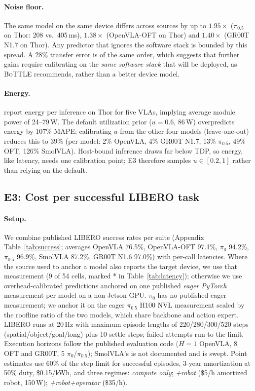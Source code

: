\documentclass[10pt]{article}
\newcommand{\bottle}{\textsc{BoTTLE}}
\begin{document}
\paragraph{Noise floor.} The same model on the same device differs across sources by up to
$1.95\times$ ($\pi_{0.5}$ on Thor: 208 vs.\ 405\,ms), $1.38\times$ (OpenVLA-OFT on Thor) and
$1.40\times$ (GR00T N1.7 on Thor). Any predictor that ignores the software stack is bounded by
this spread. A 28\% transfer error is of the same order, which suggests that further gains
require calibrating on the \emph{same software stack} that will be deployed, as \bottle{}
recommends, rather than a better device model.

\paragraph{Energy.} \citet{waseem2026where} report energy per inference on Thor for five VLAs,
implying average module power of 24--79\,W. The default utilization prior ($u{=}0.6$, 86\,W)
overpredicts energy by 107\% MAPE; calibrating $u$ from the other four models (leave-one-out)
reduces this to 39\% (per model: 2\% OpenVLA, 4\% GR00T N1.7, 13\% $\pi_{0.5}$, 49\% OFT, 126\%
SmolVLA). Host-bound inference draws far below TDP, so energy, like latency, needs one calibration
point; E3 therefore samples $u\in[0.2,1]$ rather than relying on the default.

\subsection{E3: Cost per successful LIBERO task}\label{sec:e3}
\paragraph{Setup.} We combine published LIBERO success rates per suite (Appendix
Table~\ref{tab:success}; averages OpenVLA 76.5\%, OpenVLA-OFT 97.1\%, $\pi_0$ 94.2\%, $\pi_{0.5}$
96.9\%, SmolVLA 87.2\%, GR00T N1.6 97.0\%) with per-call latencies. Where the source used to anchor a
model also reports the target device, we use that measurement (9 of 54 cells, marked * in
Table~\ref{tab:latency}); otherwise we use overhead-calibrated predictions anchored on one
published \emph{eager PyTorch} measurement per model on a non-Jetson GPU. $\pi_0$ has no published
eager measurement; we anchor it on the eager $\pi_{0.5}$ H100 NVL measurement scaled by the
roofline ratio of the two models, which share backbone and action expert. LIBERO runs at 20\,Hz
with maximum episode lengths of 220/280/300/520 steps (spatial/object/goal/long) plus 10 settle
steps; failed attempts run to the limit. Execution horizons follow the published evaluation code
($H{=}1$ OpenVLA, 8 OFT and GR00T, 5 $\pi_0$/$\pi_{0.5}$); SmolVLA's is not documented and is
swept. Point estimates use 60\% of the step limit for successful episodes, 3-year amortization at
50\% duty, \$0.15/kWh, and three regimes: \emph{compute only}; \emph{+robot} (\$5/h amortized
robot, 150\,W); \emph{+robot+operator} (\$35/h).
\end{document}
